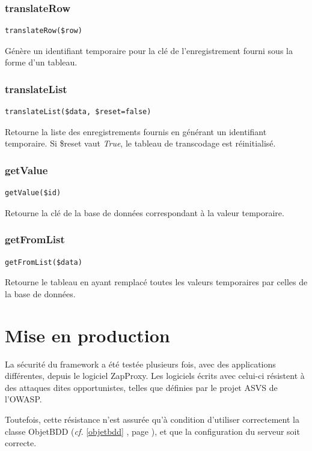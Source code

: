 \subsection{translateRow}
\begin{lstlisting}
translateRow($row)
\end{lstlisting}

Génère un identifiant temporaire pour la clé de l'enregistrement fourni sous la forme d'un tableau.

\subsection{translateList}
\begin{lstlisting}
translateList($data, $reset=false)
\end{lstlisting}
Retourne la liste des enregistrements fournis en générant un identifiant temporaire. Si \$reset vaut \textit{True}, le tableau de transcodage est réinitialisé.

\subsection{getValue}
\begin{lstlisting}
getValue($id)
\end{lstlisting}

Retourne la clé de la base de données correspondant à la valeur temporaire.

\subsection{getFromList}
\begin{lstlisting}
getFromList($data)
\end{lstlisting}
Retourne le tableau en ayant remplacé toutes les valeurs temporaires par celles de la base de données.



\chapter{Mise en production}

La sécurité du framework a été testée plusieurs fois, avec des applications différentes, depuis le logiciel ZapProxy. Les logiciels écrits avec celui-ci résistent à des attaques dites opportunistes, telles que définies par le projet ASVS de l'OWASP.

Toutefois, cette résistance n'est assurée qu'à condition d'utiliser correctement la classe ObjetBDD (\textit{cf.} \ref{objetbdd} \textit{}, page \pageref{objetbdd}), et que la configuration du serveur soit correcte.

